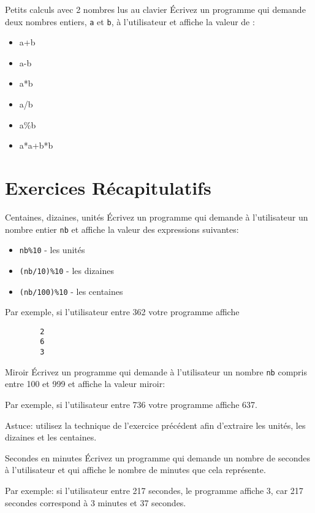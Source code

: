 \documentclass[a4paper,11pt]{article}
\begin{document}
	\begin{Exercice}{Petits calculs avec 2 nombres lus au clavier} 
		\'Ecrivez un programme qui demande 
		deux nombres entiers, \texttt{a} et \texttt{b}, à l'utilisateur et affiche la 
		valeur de :
		\begin{itemize}
		 	\item a+b
			\item a-b
			\item a*b
			\item a/b
			\item a\%b
			\item a*a+b*b
		\end{itemize} 
	\end{Exercice}


\section{Exercices Récapitulatifs}

		
	\begin{Exercice}{Centaines, dizaines, unités} 
		\'Ecrivez un programme qui demande à l'utilisateur 
		un nombre entier \texttt{nb} et affiche la valeur des 
		expressions suivantes:
		\begin{itemize}
			\item \texttt{nb\%10} - les unités
			\item \texttt{(nb/10)\%10} - les dizaines
			\item \texttt{(nb/100)\%10} - les centaines
		\end{itemize}
		Par exemple, si l'utilisateur entre 362 votre programme affiche
		\begin{verbatim}
		2
		6
		3
		\end{verbatim}
	\end{Exercice}	

	\begin{Exercice}{Miroir} 
		\'Ecrivez un programme qui demande à l'utilisateur 
		un nombre \texttt{nb} compris entre 100 et 999 et affiche la valeur miroir:

		Par exemple, si l'utilisateur entre 736 votre programme affiche 637.
		
		Astuce: utilisez la technique de l'exercice précédent afin d'extraire les
		unités, les dizaines et les centaines.
	\end{Exercice}	

	
	\begin{Exercice}{Secondes en minutes} 
		\'Ecrivez un programme qui demande un nombre de secondes à l'utilisateur
		et qui affiche le nombre de minutes que cela représente.

		Par exemple: 
		si l'utilisateur entre 217 secondes, le programme affiche 3, 
		car 217 secondes correspond à 3 minutes et 37 secondes.
	\end{Exercice}
\end{document}
